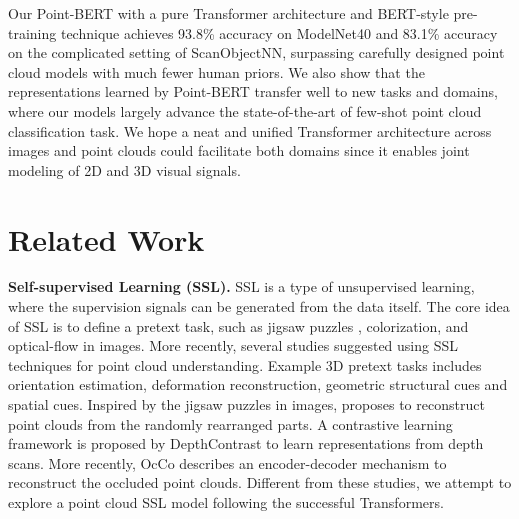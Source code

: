 \documentclass[10pt,twocolumn,letterpaper]{article}
\newcommand{\paragrapha}[2][5pt]{\vspace{#1}\noindent\textbf{#2}}
\begin{document}
 Our Point-BERT with a pure Transformer architecture and BERT-style pre-training technique achieves  93.8\% accuracy on ModelNet40 and 83.1\% accuracy on the complicated setting of ScanObjectNN, surpassing carefully designed point cloud models with much fewer human priors. We also show that the representations learned by Point-BERT transfer well to new tasks and domains, where our models largely advance the state-of-the-art of few-shot point cloud classification task. We hope a neat and unified Transformer architecture across images and point clouds could facilitate both domains since it enables joint modeling of 2D and 3D visual signals. 

\section{Related Work}
	

\paragrapha{Self-supervised Learning (SSL).} SSL is a type of unsupervised learning, where the supervision signals can be generated from the data itself\cite{hinton2020aaai}. The core idea of SSL is to define a pretext task, such as jigsaw puzzles \cite{jigsaw}, colorization\cite{colorization}, and optical-flow\cite{optical-flow} in images. More recently, several studies suggested using SSL techniques for point cloud understanding\cite{moco, infoce,pointcontrast,li2018so,Jigsaw3D,foldingnet,occo,rao2020global,eckart2021self,info3d,MD}. Example 3D pretext tasks includes orientation estimation\cite{Rotation3D},  deformation reconstruction\cite{achituve2021self}, geometric structural cues\cite{MortonNet} and spatial cues\cite{mersch2021self,sharma2020self}. Inspired by the jigsaw puzzles in images\cite{jigsaw}, \cite{Jigsaw3D} proposes to reconstruct point clouds from the randomly rearranged parts. A contrastive learning framework is proposed by DepthContrast \cite{DepthContrast} to learn representations from depth scans. More recently, OcCo\cite{occo} describes an encoder-decoder mechanism to reconstruct the occluded point clouds. Different from these studies, we attempt to explore a point cloud SSL model following the successful Transformers\cite{vaswani2017attention}.
	
\end{document}
